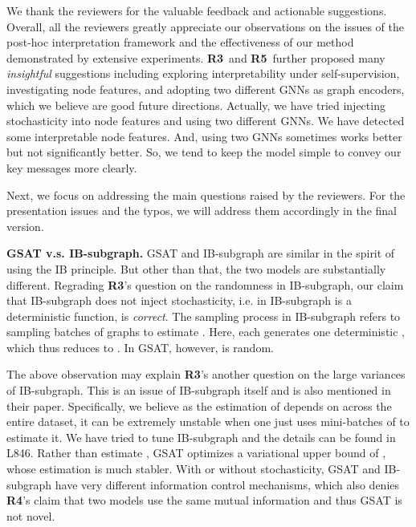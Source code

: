 \documentclass{article}
\begin{document}
\newcommand{\Rt}{\textbf{R3}}
\newcommand{\Rf}{\textbf{R4}}
\newcommand{\Rv}{\textbf{R5}}

\newpage
We thank the reviewers for the valuable feedback and actionable suggestions. Overall, all the reviewers greatly appreciate our observations on the issues of the post-hoc interpretation framework and the effectiveness of our method demonstrated by extensive experiments. \Rt~and \Rv~further proposed many \emph{insightful} suggestions including exploring interpretability under self-supervision, investigating node features, and adopting two different GNNs as graph encoders, which we believe are good future directions. Actually, we have tried injecting stochasticity into node features and using two different GNNs. We have detected some interpretable node features. And, using two GNNs sometimes works better but not significantly better. So, we tend to keep the model simple to convey our key messages more clearly. 

Next, we focus on addressing the main questions raised by the reviewers. For the presentation issues and the typos, we will address them accordingly in the final version.   

\textbf{GSAT v.s. IB-subgraph.} GSAT and IB-subgraph are similar in the spirit of using the IB principle. But other than that, the two models are substantially different. Regrading \Rt's question on the randomness in IB-subgraph, our claim that IB-subgraph does not inject stochasticity, i.e.  in IB-subgraph is a deterministic function, is \emph{correct}. The sampling process in IB-subgraph refers to sampling batches of graphs  to estimate . Here, each  generates one deterministic , which thus reduces  to . In GSAT, however,  is random.

The above observation may explain \Rt's another question on the large variances of IB-subgraph. This is an issue of IB-subgraph itself and is also mentioned in their paper. Specifically, we believe as the estimation of  depends on  across the entire dataset, it can be extremely unstable when one just uses mini-batches of  to estimate it. We have tried to tune IB-subgraph and the details can be found in L846. Rather than estimate , GSAT optimizes a variational upper bound of , whose estimation is much stabler. With or without stochasticity, GSAT and IB-subgraph have very different information control mechanisms, which also denies \Rf's claim that two models use the same mutual information and thus GSAT is not novel. 
\end{document}
